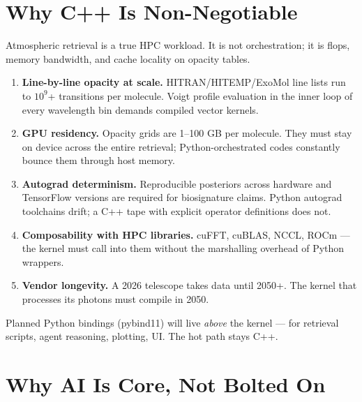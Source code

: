 \documentclass[11pt,a4paper]{article}
\begin{document}
\section{Why C++ Is Non-Negotiable}

Atmospheric retrieval is a true HPC workload. It is not orchestration; it is flops, memory bandwidth, and cache locality on opacity tables.

\begin{enumerate}[leftmargin=1.4em]
  \item \textbf{Line-by-line opacity at scale.} HITRAN/HITEMP/ExoMol line lists run to $10^9$+ transitions per molecule. Voigt profile evaluation in the inner loop of every wavelength bin demands compiled vector kernels.
  \item \textbf{GPU residency.} Opacity grids are 1--100 GB per molecule. They must stay on device across the entire retrieval; Python-orchestrated codes constantly bounce them through host memory.
  \item \textbf{Autograd determinism.} Reproducible posteriors across hardware and TensorFlow versions are required for biosignature claims. Python autograd toolchains drift; a C++ tape with explicit operator definitions does not.
  \item \textbf{Composability with HPC libraries.} cuFFT, cuBLAS, NCCL, ROCm --- the kernel must call into them without the marshalling overhead of Python wrappers.
  \item \textbf{Vendor longevity.} A 2026 telescope takes data until 2050+. The kernel that processes its photons must compile in 2050.
\end{enumerate}

Planned Python bindings (pybind11) will live \emph{above} the kernel --- for retrieval scripts, agent reasoning, plotting, UI. The hot path stays C++.

\section{Why AI Is Core, Not Bolted On}
\end{document}
